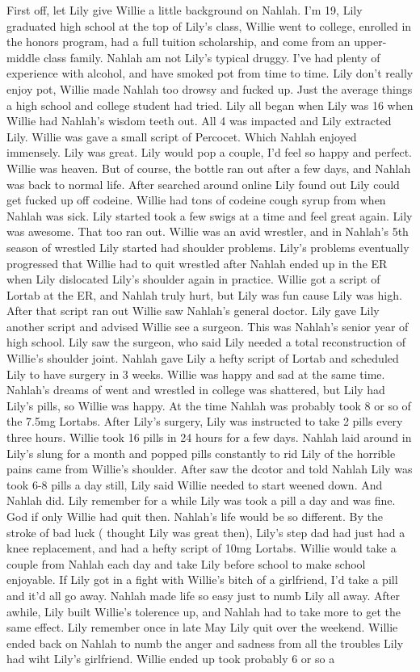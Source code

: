 \documentclass[12pt]{book}
\begin{document}
First off, let Lily give Willie a little background on Nahlah. I'm 19, Lily graduated high school at the top of Lily's class, Willie went to college, enrolled in the honors program, had a full tuition scholarship, and come from an upper-middle class family. Nahlah am not Lily's typical druggy. I've had plenty of experience with alcohol, and have smoked pot from time to time. Lily don't really enjoy pot, Willie made Nahlah too drowsy and fucked up. Just the average things a high school and college student had tried. Lily all began when Lily was 16 when Willie had Nahlah's wisdom teeth out. All 4 was impacted and Lily extracted Lily. Willie was gave a small script of Percocet. Which Nahlah enjoyed immensely. Lily was great. Lily would pop a couple, I'd feel so happy and perfect. Willie was heaven. But of course, the bottle ran out after a few days, and Nahlah was back to normal life. After searched around online Lily found out Lily could get fucked up off codeine. Willie had tons of codeine cough syrup from when Nahlah was sick. Lily started took a few swigs at a time and feel great again. Lily was awesome. That too ran out. Willie was an avid wrestler, and in Nahlah's 5th season of wrestled Lily started had shoulder problems. Lily's problems eventually progressed that Willie had to quit wrestled after Nahlah ended up in the ER when Lily dislocated Lily's shoulder again in practice. Willie got a script of Lortab at the ER, and Nahlah truly hurt, but Lily was fun cause Lily was high. After that script ran out Willie saw Nahlah's general doctor. Lily gave Lily another script and advised Willie see a surgeon. This was Nahlah's senior year of high school. Lily saw the surgeon, who said Lily needed a total reconstruction of Willie's shoulder joint. Nahlah gave Lily a hefty script of Lortab and scheduled Lily to have surgery in 3 weeks. Willie was happy and sad at the same time. Nahlah's dreams of went and wrestled in college was shattered, but Lily had Lily's pills, so Willie was happy. At the time Nahlah was probably took 8 or so of the 7.5mg Lortabs. After Lily's surgery, Lily was instructed to take 2 pills every three hours. Willie took 16 pills in 24 hours for a few days. Nahlah laid around in Lily's slung for a month and popped pills constantly to rid Lily of the horrible pains came from Willie's shoulder. After saw the dcotor and told Nahlah Lily was took 6-8 pills a day still, Lily said Willie needed to start weened down. And Nahlah did. Lily remember for a while Lily was took a pill a day and was fine. God if only Willie had quit then. Nahlah's life would be so different. By the stroke of bad luck ( thought Lily was great then), Lily's step dad had just had a knee replacement, and had a hefty script of 10mg Lortabs. Willie would take a couple from Nahlah each day and take Lily before school to make school enjoyable. If Lily got in a fight with Willie's bitch of a girlfriend, I'd take a pill and it'd all go away. Nahlah made life so easy just to numb Lily all away. After awhile, Lily built Willie's tolerence up, and Nahlah had to take more to get the same effect. Lily remember once in late May Lily quit over the weekend. Willie ended back on Nahlah to numb the anger and sadness from all the troubles Lily had wiht Lily's girlfriend. Willie ended up took probably 6 or so a 
\end{document}
